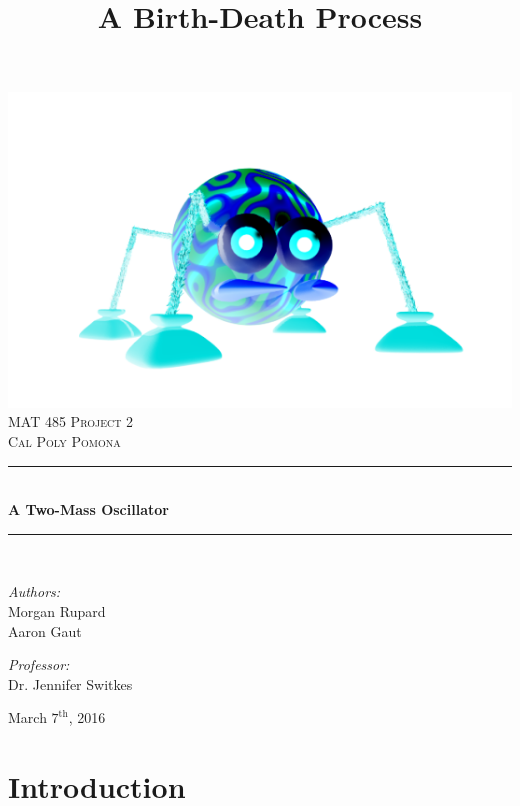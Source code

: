 \documentclass[11pt, oneside]{article}   	%
\title{A Birth-Death Process}
\newcommand{\HRule}{\rule{\linewidth}{0.5mm}}
\begin{document}
\frenchspacing
\begin{titlepage}
		\begin{center}
			\includegraphics[scale=0.2]{logo}\\[1cm]
			
			\textsc{\LARGE MAT 485 Project 2}\\[2cm]
			\textsc{\Large Cal Poly Pomona}\\[1cm]
			
		
			\HRule \\[0.4cm]
			{\huge \bfseries A Two-Mass Oscillator \\[0.4cm]}
			\HRule \\[2cm]
			
			\noindent
			\begin{minipage}{0.4\textwidth}
				\begin{flushleft}
					\large
					\emph{Authors:}\\
					Morgan Rupard \\ Aaron Gaut
				\end{flushleft}
			\end{minipage}
			\begin{minipage}{0.4\textwidth}
				\begin{flushright}
					\large
					\emph{Professor:}\\
					Dr. Jennifer Switkes
			\end{flushright}
			\end{minipage}
			
			\vfill
			
			{\large March $7^{\text{th}}$, 2016}
		\end{center}
	\end{titlepage}

\tableofcontents
\newpage

\section{Introduction}
\end{document}
